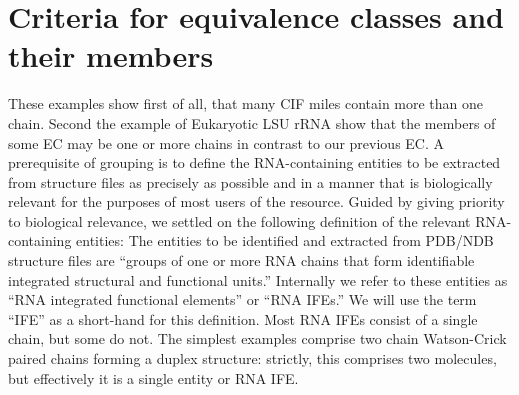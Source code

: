 \section{Criteria for equivalence classes and their members}

These examples show first of all, that many CIF miles contain more than one
chain. Second the example of Eukaryotic LSU rRNA show that the members of some
EC may be one or more chains in contrast to our previous EC. A prerequisite of
grouping is to define the RNA-containing entities to be extracted from structure
files as precisely as possible and in a manner that is biologically relevant for
the purposes of most users of the resource. Guided by giving priority to
biological relevance, we settled on the following definition of the relevant
RNA-containing entities: The entities to be identified and extracted from
PDB/NDB structure files are “groups of one or more RNA chains that form
identifiable integrated structural and functional units.” Internally we refer to
these entities as “RNA integrated functional elements” or “RNA IFEs.” We will
use the term “IFE” as a short-hand for this definition.  Most RNA IFEs consist
of a single chain, but some do not. The simplest examples comprise two chain
Watson-Crick paired chains forming a duplex structure: strictly, this comprises
two molecules, but effectively it is a single entity or RNA IFE. 


